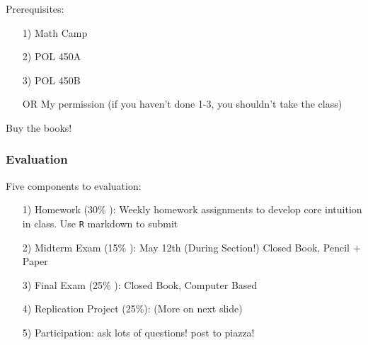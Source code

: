 \documentclass{beamer}
\begin{document}
\begin{frame}
Prerequisites:
\begin{itemize}
\item[1)] Math Camp
\item[2)] POL 450A
\item[3)] POL 450B
\item[OR] My permission  (if you haven't done 1-3, you shouldn't take the class)
\end{itemize}

Buy the books!
\end{frame}



\begin{frame}
\frametitle{Evaluation}
Five components to evaluation:

\begin{itemize}
\item[1)] Homework (30\% ): Weekly homework assignments to develop core intuition in class.  Use {\tt R} markdown to submit
\item[2)] Midterm Exam (15\% ): \alert{May 12th} (During Section!) Closed Book, Pencil + Paper
\item[3)] Final Exam (25\% ): Closed Book, Computer Based
\item[4)] Replication Project (25\%): (More on next slide)
\item[5)] Participation: ask lots of questions! post to piazza!
\end{itemize}


\end{frame}
\end{document}
